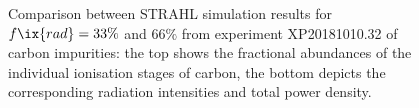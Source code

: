 %
            \begin{figure}[t]%
                \centering%
                \captionsetup{width=.47\textwidth}%
                \begin{minipage}[c]{0.48\textwidth}%
                    \centering%
                \end{minipage}%
                \hfill%
                \begin{minipage}[c]{0.48\textwidth}%
                    \centering%
                    \caption{Comparison between STRAHL simulation results for $f\ix{rad}=33\%$ and $66\%$ from experiment XP20181010.32 of carbon impurities: the top shows the fractional abundances of the individual ionisation stages of carbon, the bottom depicts the corresponding radiation intensities and total power density.}\label{fig:nete_abund_lines_91_92}%
                \end{minipage}%
            \end{figure}%
%

